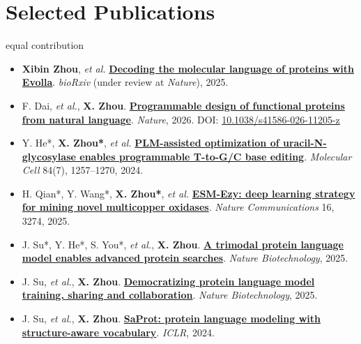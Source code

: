 \documentclass[10pt]{article}
\begin{document}
\section*{Selected Publications}
{\footnotesize * equal contribution}
\begin{itemize}[itemsep=0pt]
    \item \textbf{Xibin Zhou}, \textit{et al.} \href{https://doi.org/10.1101/2025.01.05.630192}{\textbf{Decoding the molecular language of proteins with Evolla}}. \textit{bioRxiv} (under review at \textit{Nature}), 2025.
    \item F. Dai, \textit{et al.}, \textbf{X. Zhou}. \href{https://doi.org/10.1038/s41586-026-11205-z}{\textbf{Programmable design of functional proteins from natural language}}. \textit{Nature}, 2026. DOI: \href{https://doi.org/10.1038/s41586-026-11205-z}{10.1038/s41586-026-11205-z}
    \item Y. He*, \textbf{X. Zhou*}, \textit{et al.} \href{https://doi.org/10.1016/j.molcel.2024.01.021}{\textbf{PLM-assisted optimization of uracil-N-glycosylase enables programmable T-to-G/C base editing}}. \textit{Molecular Cell} 84(7), 1257--1270, 2024.
    \item H. Qian*, Y. Wang*, \textbf{X. Zhou*}, \textit{et al.} \href{https://doi.org/10.1038/s41467-025-58521-y}{\textbf{ESM-Ezy: deep learning strategy for mining novel multicopper oxidases}}. \textit{Nature Communications} 16, 3274, 2025.
    \item J. Su*, Y. He*, S. You*, \textit{et al.}, \textbf{X. Zhou}. \href{https://doi.org/10.1038/s41587-025-02836-0}{\textbf{A trimodal protein language model enables advanced protein searches}}. \textit{Nature Biotechnology}, 2025.
    \item J. Su, \textit{et al.}, \textbf{X. Zhou}. \href{https://doi.org/10.1038/s41587-025-02859-7}{\textbf{Democratizing protein language model training, sharing and collaboration}}. \textit{Nature Biotechnology}, 2025.
    \item J. Su, \textit{et al.}, \textbf{X. Zhou}. \href{https://openreview.net/forum?id=6MRm3G4NiU}{\textbf{SaProt: protein language modeling with structure-aware vocabulary}}. \textit{ICLR}, 2024.
\end{itemize}
\end{document}

